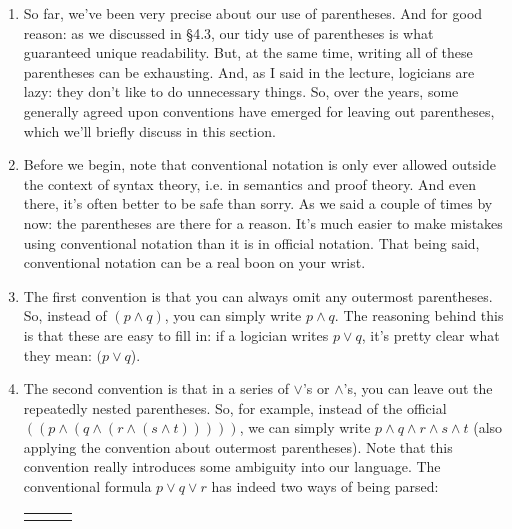 	\begin{enumerate}[\thesection.1]

		\item So far, we've been very precise about our use of parentheses. And for good reason: as we discussed in \S4.3, our tidy use of parentheses is what guaranteed unique readability. But, at the same time, writing all of these parentheses can be exhausting. And, as I said in the lecture, logicians are lazy: they don't like to do unnecessary things. So, over the years, some generally agreed upon conventions have emerged for leaving out parentheses, which we'll briefly discuss in this section.
		
		\item Before we begin, note that conventional notation is only ever allowed outside the context of syntax theory, i.e. in semantics and proof theory. And even there, it's often better to be safe than sorry. As we said a couple of times by now: the parentheses are there for a reason. It's much easier to make mistakes using conventional notation than it is in official notation. That being said, conventional notation can be a real boon on your wrist.
		
		\item The first convention is that you can always omit any outermost parentheses. So, instead of $(p\land q)$, you can simply write $p\land q$. The reasoning behind this is that these are easy to fill in: if a logician writes $p\lor q$, it's pretty clear what they mean: $(p\lor q$).
		
		\item The second convention is that in a series of $\lor$'s or $\land$'s, you can leave out the repeatedly nested parentheses. So, for example, instead of the official $((p\land (q\land (r\land (s\land t)))))$, we can simply write $p\land q\land r\land s\land t$ (also applying the convention about outermost parentheses). Note that this convention really introduces some ambiguity into our language. The conventional formula $p\lor q\lor r$ has indeed two ways of being parsed:
		\begin{center}
		
		\begin{tabular}{c c c}
		\begin{tikzpicture}
		{\Tree [.$p\lor q\lor r$ [.$p$ ] [.$q\lor r$ [.$q$ ] [.$r$ ] ] ]}
		\end{tikzpicture}

		& 
		
		\qquad \raisebox{7.5ex}{vs.} \qquad 
				\begin{tikzpicture}


\end{tikzpicture}
\end{tabular}
\end{center}
\end{enumerate}
